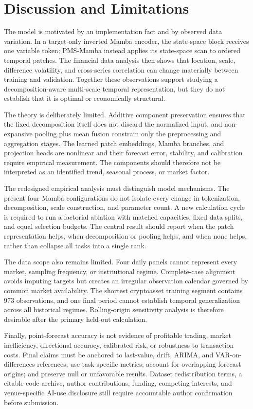\section{Discussion and Limitations}

The model is motivated by an implementation fact and by observed data variation.
In a target-only inverted Mamba encoder, the state-space block receives one variable token; PMS-Mamba instead applies its state-space scan to ordered temporal patches.
The financial data analysis then shows that location, scale, difference volatility, and cross-series correlation can change materially between training and validation.
Together these observations support studying a decomposition-aware multi-scale temporal representation, but they do not establish that it is optimal or economically structural.

The theory is deliberately limited.
Additive component preservation ensures that the fixed decomposition itself does not discard the normalized input, and non-expansive pooling plus mean fusion constrain only the preprocessing and aggregation stages.
The learned patch embeddings, Mamba branches, and projection heads are nonlinear and their forecast error, stability, and calibration require empirical measurement.
The components should therefore not be interpreted as an identified trend, seasonal process, or market factor.

The redesigned empirical analysis must distinguish model mechanisms.
The present four Mamba configurations do not isolate every change in tokenization, decomposition, scale construction, and parameter count.
A new calculation cycle is required to run a factorial ablation with matched capacities, fixed data splits, and equal selection budgets.
The central result should report when the patch representation helps, when decomposition or pooling helps, and when none helps, rather than collapse all tasks into a single rank.

The data scope also remains limited.
Four daily panels cannot represent every market, sampling frequency, or institutional regime.
Complete-case alignment avoids imputing targets but creates an irregular observation calendar governed by common market availability.
The shortest cryptoasset training segment contains 973 observations, and one final period cannot establish temporal generalization across all historical regimes.
Rolling-origin sensitivity analysis is therefore desirable after the primary held-out calculation.

Finally, point-forecast accuracy is not evidence of profitable trading, market inefficiency, directional accuracy, calibrated risk, or robustness to transaction costs.
Final claims must be anchored to last-value, drift, ARIMA, and VAR-on-differences references; use task-specific metrics; account for overlapping forecast origins; and preserve null or unfavorable results.
Dataset redistribution terms, a citable code archive, author contributions, funding, competing interests, and venue-specific AI-use disclosure still require accountable author confirmation before submission.
